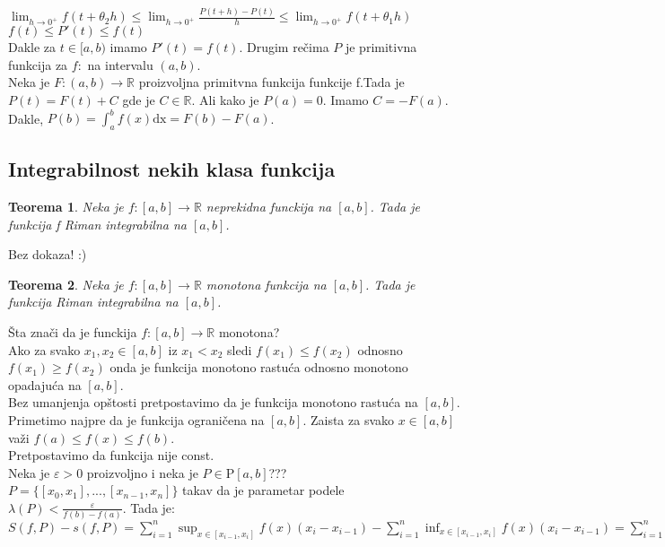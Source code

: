 \documentclass{article}
\newtheorem{teorema}{Teorema}[section]
\begin{document}
$\displaystyle \lim_{h\rightarrow 0^+} f(t+\theta_2h) \leq \lim_{h\rightarrow 0^+} \frac{P(t + h) - P(t)}{h} \leq \lim_{h\rightarrow 0^+} f(t+\theta_1h)$\\
$f(t) \leq P'(t) \leq f(t)$\\
Dakle za $t \in [a, b)$ imamo $P'(t) = f(t)$. Drugim rečima $P$ je primitivna funkcija za $f:$ na intervalu $(a, b)$.\\
Neka je $F: (a, b) \rightarrow \mathbb{R}$ proizvoljna primitvna funkcija funkcije f.Tada je $P(t) = F(t) + C$ gde je $C \in \mathbb{R}$. Ali kako je $P(a) = 0$. Imamo $C = -F(a)$.\\
Dakle, $P(b) = \displaystyle \int^b_a f(x) \text{dx} = F(b) - F(a)$.
\subsection{Integrabilnost nekih klasa funkcija}
\begin{teoremabox}
    \begin{teorema}
        Neka je $f: [a, b] \rightarrow \mathbb{R}$ neprekidna funckija na $[a, b]$. Tada je funkcija f Riman integrabilna na $[a, b]$.
    \end{teorema}
    Bez dokaza! :)
\end{teoremabox}
\begin{teoremabox}
    \begin{teorema}
        Neka je $f: [a, b] \rightarrow \mathbb{R}$ monotona funkcija na $[a, b]$. Tada je funkcija Riman integrabilna na $[a, b]$.
    \end{teorema}
\end{teoremabox}
Šta znači da je funckija $f:[a, b] \rightarrow \mathbb{R}$ monotona?\\
Ako za svako $x_1, x_2 \in [a, b]$ iz $x_1 < x_2$ sledi $f(x_1) \leq f(x_2)$ odnosno $f(x_1) \geq f(x_2)$ onda je funkcija monotono rastuća odnosno monotono opadajuća na $[a, b]$.\\
Bez umanjenja opštosti pretpostavimo da je funkcija monotono rastuća na $[a, b]$. Primetimo najpre da je funkcija ograničena na $[a,b]$. Zaista za svako $x \in [a, b]$ važi $f(a) \leq f(x) \leq f(b)$.\\
Pretpostavimo da funkcija nije const.\\
Neka je $\varepsilon > 0$ proizvoljno i neka je $P \in \text{P}[a, b]$??? $P =\{[x_0, x_1], ..., [x_{n-1}, x_n]\}$ takav da je parametar podele $\lambda(P) < \frac{\varepsilon}{f(b) - f(a)}$. Tada je: \\
$S(f, P) - s(f, P) = \displaystyle \sum^n_{i = 1}\sup_{x\in[x_{i-1}, x_i]}f(x)(x_i - x_{i-1}) - \sum^n_{i = 1}\inf_{x\in[x_{i-1}, x_i]}f(x)(x_i - x_{i-1}) = \sum_{i=1}^n(f(x_i)-f(x_{i-1})(x_i - x_{i-1}) < \sum^n_{i=1}(f(x_i) - f(x_{i-1}))\frac{\varepsilon}{f(b) - f(a)} = \frac{\varepsilon}{f(b) - f(a)}\sum^n_{i=1}(f(x_i) - f(x_{i-1})) = \frac{\varepsilon}{f(b) - f(a)} (f(b) - f(a)) = \varepsilon$
\end{document}
